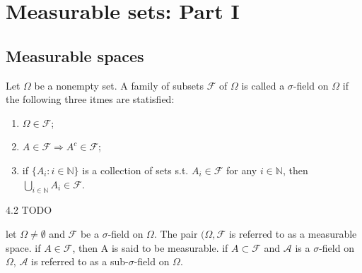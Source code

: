 \chapter{Measurable sets: Part I}%
\label{cha:Measurable sets: Part I}
\section{Measurable spaces}%
\label{sec:Measurable spaces}

\begin{definition}
    \label{def:4.1}
    Let $\Omega$ be a nonempty set. A family of subsets $\mathcal{F}$ of $\Omega$ is called
    a $\sigma$-field on $\Omega$ if the following three itmes are statisfied:
    \begin{enumerate}[label=(\roman*)]
        \item $\Omega \in \mathcal{F}$;
        \item $A \in \mathcal{F} \Rightarrow A^{c} \in \mathcal{F}$;
        \item if $\{ A_i: i \in  \mathbb{N}\} $ is a collection of sets s.t. $A_i \in \mathcal{F}$ 
            for any $i \in \mathbb{N}$, then $\bigcup_{i \in \mathbb{N}} A_i \in \mathcal{F}$.
    \end{enumerate}
\end{definition}

\begin{definition}[]
    \label{def:4.2}
    4.2 TODO
\end{definition}

\begin{definition}
    \label{def:4.3}
    let $\Omega \neq \emptyset$ and $\mathcal{F}$ be a $\sigma$-field on $\Omega$. The pair $(\Omega, \mathcal{F}$ is referred 
    to as a measurable space. if $A \in \mathcal{F}$, then A is said to be measurable. if $A\subset \mathcal{F}$ and
    $\mathcal{A}$ is a $\sigma$-field on $\Omega$, $\mathcal{A}$ is referred to as a sub-$\sigma$-field on $\Omega$.
\end{definition}
